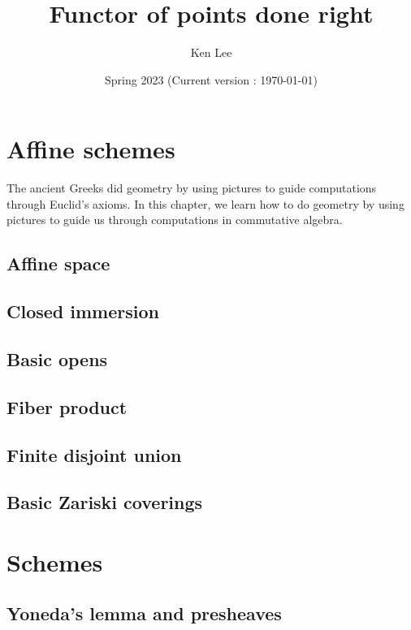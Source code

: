 \documentclass{article}
\begin{document}
\title{Functor of points done right}

\author{Ken Lee}
\date{Spring 2023 (Current version : \today)}
\maketitle

\tableofcontents



\section{Affine schemes}
  The ancient Greeks did geometry by using pictures to guide
  computations through Euclid's axioms.
  In this chapter,
  we learn how to do geometry by using pictures to guide us through
  computations in commutative algebra.

  \subsection{Affine space}
  \subsection{Closed immersion}
  \subsection{Basic opens}
  \subsection{Fiber product}
  \subsection{Finite disjoint union}
  \subsection{Basic Zariski coverings}
  

\section{Schemes}
  \subsection{Yoneda's lemma and presheaves}
\end{document}
